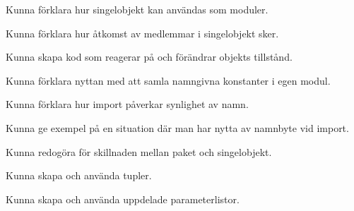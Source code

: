 
\item Kunna förklara hur singelobjekt kan användas som moduler.
\item Kunna förklara hur åtkomst av medlemmar i singelobjekt sker.
\item Kunna skapa kod som reagerar på och förändrar objekts tillstånd.
\item Kunna förklara nyttan med att samla namngivna konstanter i egen modul.
\item Kunna förklara hur import påverkar synlighet av namn.
\item Kunna ge exempel på en situation där man har nytta av namnbyte vid import.
\item Kunna redogöra för skillnaden mellan paket och singelobjekt.
\item Kunna skapa och använda tupler.
\item Kunna skapa och använda uppdelade parameterlistor.
